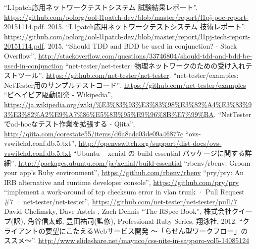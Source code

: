 
\begin{thebibliography}{99}
         ``L1patch応用ネットワークテストシステム 試験結果レポート''.
         \url{https://github.com/oolorg/ool-l1patch-dev/blob/master/report/l1pj-poc-report-20151114.pdf}.
         2015.
         ``L1patch応用ネットワークテストシステム 技術レポート''.
         \url{https://github.com/oolorg/ool-l1patch-dev/blob/master/report/l1pj-tech-report-20151114.pdf}.
         2015.
         ``Should TDD and BDD be used in conjunction? - Stack Overflow'',
         \url{http://stackoverflow.com/questions/33746804/should-tdd-and-bdd-be-used-in-conjunction}
         ``net-tester/net-tester: 物理ネットワークのための受け入れテストツール'',
         \url{https://github.com/net-tester/net-tester}.
         ``net-tester/examples: NetTester用のサンプルテストコード'',
         \url{https://github.com/net-tester/examples}
         ``ビヘイビア駆動開発 - Wikipedia'',
         \url{https://ja.wikipedia.org/wiki/%E3%83%93%E3%83%98%E3%82%A4%E3%83%93%E3%82%A2%E9%A7%86%E5%8B%95%E9%96%8B%E7%99%BA}.
         ``NetTesterでad-hocなテスト作業を拡張する - Qiita'',
         \url{http://qiita.com/corestate55/items/d6a8cdc03de09a46877c}
         ``ovs-vswitchd.conf.db.5.txt'',
         \url{http://openvswitch.org/support/dist-docs/ovs-vswitchd.conf.db.5.txt}
         ``Ubuntu – xenial の build-essential パッケージに関する詳細'',
         \url{http://packages.ubuntu.com/ja/xenial/build-essential}
         ``rbenv/rbenv: Groom your app’s Ruby environment'',
         \url{https://github.com/rbenv/rbenv}
         ``pry/pry: An IRB alternative and runtime developer console'',
         \url{https://github.com/pry/pry}
  ``implement a work-around of tcp checksum
         error in vlan trunk · Pull Request \#7 ·
         net-tester/net-tester'',
         \url{https://github.com/net-tester/net-tester/pull/7}
  David Chelimsky, Dave Astels , Zach Dennis ``The
         RSpec Book'', 株式会社クイープ(訳), 角谷信太郎, 豊田祐司(監修),
         Professional Ruby Series, 翔泳社, 2012.
         ``クライアントの要望にこたえるWebサービス開発 ～「らせん型ワークフロー」のススメ～''.
         \url{http://www.slideshare.net/mayuco/css-nite-in-sapporo-vol5-14085124}

\end{thebibliography}
